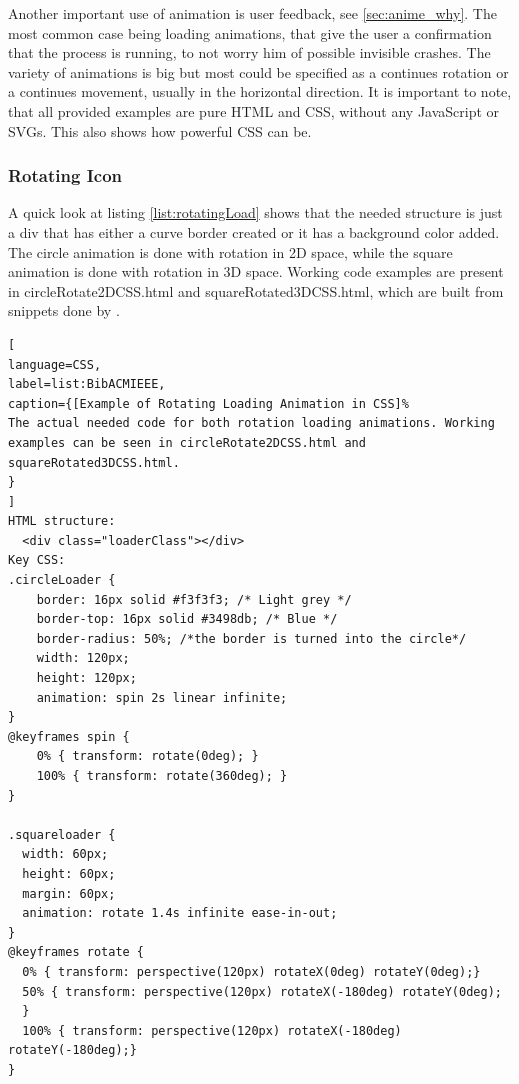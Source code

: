 Another important use of animation is user feedback, see \ref{sec:anime_why}. The most common case being loading animations, that give the user a confirmation that the process is running, to not worry him of possible invisible crashes. The variety of animations is big but most could be specified as a continues rotation or a continues movement, usually in the horizontal direction. It is important to note, that all provided examples are pure HTML and CSS, without any JavaScript or SVGs. This also shows how powerful CSS can be.

\subsubsection{Rotating Icon} %
\label{subsub:rotation_loader}
A quick look at listing \ref{list:rotatingLoad} shows that the needed structure is just a div that has either a curve border created or it has a background color added. The circle animation is done with rotation in 2D space, while the square animation is done with rotation in 3D space. Working code examples are present in circleRotate2DCSS.html and squareRotated3DCSS.html, which are built from snippets done by \citet{cirleLoader,otherLoaders}.

\begin{lstlisting}[
language=CSS,
label=list:BibACMIEEE,
caption={[Example of Rotating Loading Animation in CSS]%
The actual needed code for both rotation loading animations. Working examples can be seen in circleRotate2DCSS.html and squareRotated3DCSS.html.
}
]
HTML structure:
  <div class="loaderClass"></div>
Key CSS:
.circleLoader {
	border: 16px solid #f3f3f3; /* Light grey */
	border-top: 16px solid #3498db; /* Blue */
	border-radius: 50%; /*the border is turned into the circle*/
	width: 120px;
	height: 120px;
	animation: spin 2s linear infinite;
}
@keyframes spin {
	0% { transform: rotate(0deg); }
	100% { transform: rotate(360deg); }
}

.squareloader {
  width: 60px;
  height: 60px;
  margin: 60px;
  animation: rotate 1.4s infinite ease-in-out;
}
@keyframes rotate {
  0% { transform: perspective(120px) rotateX(0deg) rotateY(0deg);}
  50% { transform: perspective(120px) rotateX(-180deg) rotateY(0deg);
  }
  100% { transform: perspective(120px) rotateX(-180deg) rotateY(-180deg);}
}
\end{lstlisting}
\label{list:rotatingLoad}

